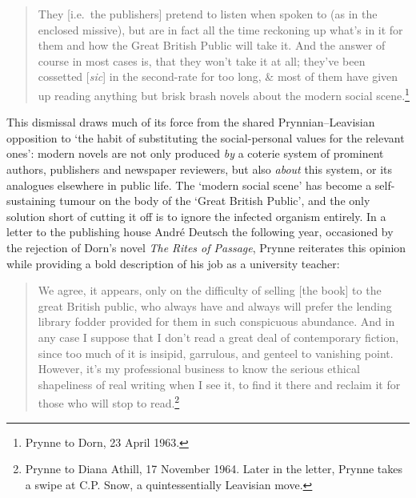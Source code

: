 \documentclass[]{article}
\begin{document}
\begin{quote}
They {[}i.e.~the publishers{]} pretend to listen when spoken to (as in
the enclosed missive), but are in fact all the time reckoning up what's
in it for them and how the Great British Public will take it. And the
answer of course in most cases is, that they won't take it at all;
they've been cossetted {[}\emph{sic}{]} in the second-rate for too long,
\& most of them have given up reading anything but brisk brash novels
about the modern social scene.\footnote{Prynne to Dorn, 23 April 1963.}
\end{quote}

\noindent This dismissal draws much of its force from the shared
Prynnian--Leavisian opposition to `the habit of substituting the
social-personal values for the relevant ones': modern novels are not
only produced \emph{by} a coterie system of prominent authors,
publishers and newspaper reviewers, but also \emph{about} this system,
or its analogues elsewhere in public life. The `modern social scene' has
become a self-sustaining tumour on the body of the `Great British
Public', and the only solution short of cutting it off is to ignore the
infected organism entirely. In a letter to the publishing house André
Deutsch the following year, occasioned by the rejection of Dorn's novel
\emph{The Rites of Passage}, Prynne reiterates this opinion while
providing a bold description of his job as a university teacher:

\begin{quote}
We agree, it appears, only on the difficulty of selling {[}the book{]}
to the great British public, who always have and always will prefer the
lending library fodder provided for them in such conspicuous abundance.
And in any case I suppose that I don't read a great deal of contemporary
fiction, since too much of it is insipid, garrulous, and genteel to
vanishing point. However, it's my professional business to know the
serious ethical shapeliness of real writing when I see it, to find it
there and reclaim it for those who will stop to read.\footnote{Prynne to
  Diana Athill, 17 November 1964. Later in the letter, Prynne takes a
  swipe at C.P. Snow, a quintessentially Leavisian move.}
\end{quote}
\end{document}
